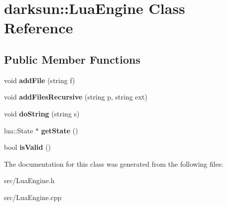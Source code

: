 \hypertarget{classdarksun_1_1_lua_engine}{}\section{darksun\+::Lua\+Engine Class Reference}
\label{classdarksun_1_1_lua_engine}
\subsection*{Public Member Functions}
\begin{DoxyCompactItemize}
\item 
\mbox{\label{classdarksun_1_1_lua_engine_accc2a0d66e061cd3d0f3abdd6e45e291}} 
void {\bfseries add\+File} (string f)
\item 
\mbox{\label{classdarksun_1_1_lua_engine_ac71f98fdca37fe76a0956ffb7dbb8ef6}} 
void {\bfseries add\+Files\+Recursive} (string p, string ext)
\item 
\mbox{\label{classdarksun_1_1_lua_engine_af047e5b92d074072e104e7eecb4f003e}} 
void {\bfseries do\+String} (string s)
\item 
\mbox{\label{classdarksun_1_1_lua_engine_a2762d1b803fcbf144e00416f451cf368}} 
lua\+::\+State $\ast$ {\bfseries get\+State} ()
\item 
\mbox{\label{classdarksun_1_1_lua_engine_a26cb2c63eeba9ecaa1236efa408b3dcd}} 
bool {\bfseries is\+Valid} ()
\end{DoxyCompactItemize}


The documentation for this class was generated from the following files\+:\begin{DoxyCompactItemize}
\item 
src/Lua\+Engine.\+h\item 
src/Lua\+Engine.\+cpp\end{DoxyCompactItemize}
